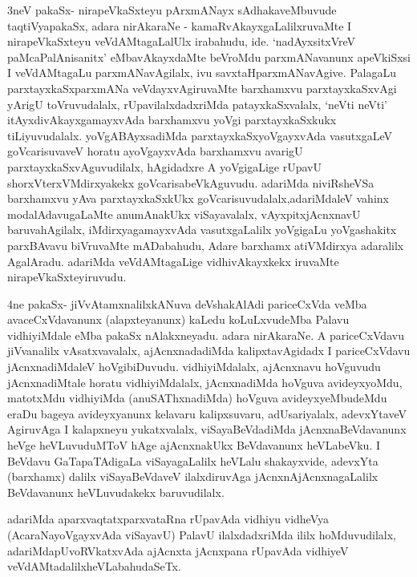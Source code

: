 \begin{artha}
3neV pakaSx- nirapeVkaSxteyu pArxmANayx sAdhakaveMbuvude taqtiVyapakaSx,
adara nirAkaraNe - kamaRvAkayxgaLalilxruvaMte I nirapeVkaSxteyu
veVdAMtagaLalUlx irabahudu, ide. `nadAyxsitxVreV paMcaPalAnisanitx' eMbavAkayxdaMte beVroMdu
parxmANavanunx apeVkiSxsi I veVdAMtagaLu parxmANavAgilalx, ivu
savxtaHparxmANavAgive. PalagaLu parxtayxkaSxparxmANa veVdayxvAgiruvaMte
barxhamxvu parxtayxkaSxvAgi yArigU toVruvudalalx, rUpavilalxdadxriMda
patayxkaSxvalalx, `neVti neVti' itAyxdivAkayxgamayxvAda barxhamxvu
yoVgi parxtayxkaSxkukx tiLiyuvudalalx. yoVgABAyxsadiMda
parxtayxkaSxyoVgayxvAda vasutxgaLeV goVcarisuvaveV horatu
ayoVgayxvAda barxhamxvu avarigU parxtayxkaSxvAguvudilalx, hAgidadxre
A yoVgigaLige rUpavU shorxVterxVMdirxyakekx
goVcarisabeVkAguvudu. adariMda niviRsheVSa barxhamxvu yAva
parxtayxkaSxkUkx goVcarisuvudalalx,\break adariMdaleV vahinx
modalAdavugaLaMte anumAnakUkx viSayavalalx, vAyxpitxjAcnxnavU
 baruvahAgilalx, iMdirxyagamayxvAda vasutxgaLalilx yoVgigaLu
yoVgashakitx parxBAvavu biVruvaMte mADabahudu, Adare barxhamx
atiVMdirxya adaralilx AgalAradu.  adariMda veVdAMtagaLige
vidhivAkayxkekx iruvaMte nirapeVkaSxteyiruvudu.
\end{artha}

\begin{artha}
4ne pakaSx- jiVvAtamxnalilxkANuva deVshakAlAdi pariceCxVda veMba
avaceCxVdavanunx (alapxteyanunx) kaLedu koLuLxvudeMba Palavu
vidhiyiMdale eMba pakaSx nAlakxneyadu. adara
nirAkaraNe. A pariceCxVdavu jiVvanalilx vAsatxvavalalx, ajAcnxnadadiMda
kalipxtavAgidadx I pariceCxVdavu jAcnxnadiMdaleV
hoVgibiDuvudu. vidhiyiMdalalx, ajAcnxnavu	hoVguvudu jAcnxnadiMtale
horatu vidhiyiMdalalx, jAcnxnadiMda hoVguva avideyxyoMdu, matotxMdu
vidhiyiMda (anuSAThxnadiMda) hoVguva avideyxyeMbudeMdu eraDu bageya
avideyxyanunx kelavaru kalipxsuvaru, adUsariyalalx, adevxYtaveV
AgiruvAga I kalapxneyu yukatxvalalx, viSayaBeVdadiMda
jAcnxnaBeVdavanunx heVge heVLuvuduMToV hAge ajAcnxnakUkx BeVdavanunx
heVLabeVku. I BeVdavu GaTapaTAdigaLa viSayagaLalilx heVLalu
shakayxvide, adevxYta (barxhamx) dalilx viSayaBeVdaveV ilalxdiruvAga
jAcnxnA\s jAcnxnagaLalilx BeVdavanunx heVLuvudakekx baruvudilalx.

adariMda aparxvaqtatxparxvataRna rUpavAda vidhiyu vidheVya
(AcaraNayoVgayxvAda viSayavU) PalavU ilalxdadxriMda ililx
hoMduvudilalx, adariMda\break pUvoRVkatxvAda ajAcnxta jAcnxpana rUpavAda
vidhiyeV veVdAMtadalilx\break heVLabahudaSeTx.
\end{artha}

\centerline{}

